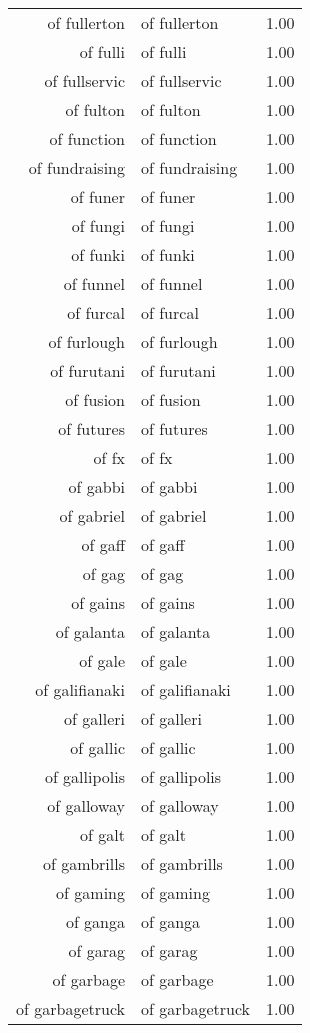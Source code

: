 \begin{table}[ht]
\begin{tabular}{rlr}
  of fullerton & of fullerton & 1.00 \\ 
  of fulli & of fulli & 1.00 \\ 
  of fullservic & of fullservic & 1.00 \\ 
  of fulton & of fulton & 1.00 \\ 
  of function & of function & 1.00 \\ 
  of fundraising & of fundraising & 1.00 \\ 
  of funer & of funer & 1.00 \\ 
  of fungi & of fungi & 1.00 \\ 
  of funki & of funki & 1.00 \\ 
  of funnel & of funnel & 1.00 \\ 
  of furcal & of furcal & 1.00 \\ 
  of furlough & of furlough & 1.00 \\ 
  of furutani & of furutani & 1.00 \\ 
  of fusion & of fusion & 1.00 \\ 
  of futures & of futures & 1.00 \\ 
  of fx & of fx & 1.00 \\ 
  of gabbi & of gabbi & 1.00 \\ 
  of gabriel & of gabriel & 1.00 \\ 
  of gaff & of gaff & 1.00 \\ 
  of gag & of gag & 1.00 \\ 
  of gains & of gains & 1.00 \\ 
  of galanta & of galanta & 1.00 \\ 
  of gale & of gale & 1.00 \\ 
  of galifianaki & of galifianaki & 1.00 \\ 
  of galleri & of galleri & 1.00 \\ 
  of gallic & of gallic & 1.00 \\ 
  of gallipolis & of gallipolis & 1.00 \\ 
  of galloway & of galloway & 1.00 \\ 
  of galt & of galt & 1.00 \\ 
  of gambrills & of gambrills & 1.00 \\ 
  of gaming & of gaming & 1.00 \\ 
  of ganga & of ganga & 1.00 \\ 
  of garag & of garag & 1.00 \\ 
  of garbage & of garbage & 1.00 \\ 
  of garbagetruck & of garbagetruck & 1.00 \\ 

\end{tabular}
\end{table}
